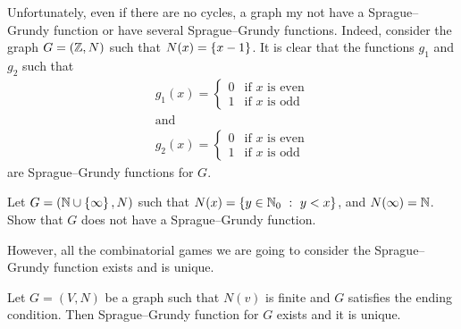Unfortunately, even if there are no cycles, a graph my not have a
Sprague--Grundy function or have several Sprague--Grundy functions. Indeed,
consider the graph $G = ({\mathbb{Z}}, N)$ such that $N(x) = \set{x - 1}$. It is clear
that the functions $g_1$ and $g_2$ such that
\begin{gather*}
    g_1(x) =
    \begin{cases}
        0 & \text{if } x \text{ is even} \\
        1 & \text{if } x \text{ is odd}
    \end{cases} \\
    \text{and} \\
    g_2(x) =
    \begin{cases}
        0 & \text{if } x \text{ is even} \\
        1 & \text{if } x \text{ is odd}
    \end{cases}
\end{gather*}
are Sprague--Grundy functions for $G$.

\begin{exercise}
    Let $G = (\N \cup \set{\infty}, N)$ such that 
    $N(x) = \set[y < x]{y \in \N_0}$, and $N(\infty) = {\mathbb{N}}$.
    Show that $G$ does not have a Sprague--Grundy function.
\end{exercise}

However, all the combinatorial games we are going to consider
the Sprague--Grundy function exists and is unique.
\begin{theorem}
\label{theorem:ending-condiction-sg-function}
  Let $G = (V, N)$ be a graph such that $N(v)$ is finite and $G$ satisfies the
  ending condition. Then Sprague--Grundy function for $G$ exists and it is
  unique.
\end{theorem}

